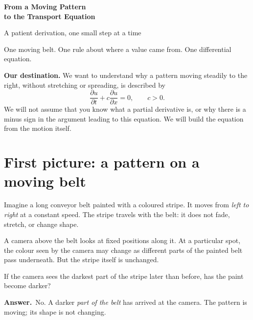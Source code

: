 \documentclass[11pt,a4paper]{article}
\newcommand{\ut}{\frac{\partial u}{\partial t}}
\newcommand{\ux}{\frac{\partial u}{\partial x}}
\newcommand{\secstart}[1]{\Needspace{7\baselineskip}\section{#1}}
\newcommand{\answer}{\par\smallskip\textbf{Answer.}~}
\begin{document}
\thispagestyle{fancy}
\vspace*{6mm}
{\centering
{\Huge\bfseries\color{navy} From a Moving Pattern\\[3pt]to the Transport Equation\par}
\vspace{7mm}
{\large\color{muted} A patient derivation, one small step at a time\par}
\vspace{11mm}
{\small\sffamily One moving belt. One rule about where a value came from. One differential equation.\par}
}
\vspace{9mm}
\begin{pointbox}
\textbf{Our destination.} We want to understand why a pattern moving steadily to the right, without stretching or spreading, is described by
\[
\boxed{\displaystyle \ut+c\ux=0,\qquad c>0.}
\]
We will not assume that you know what a partial derivative is, or why there is a minus sign in the argument leading to this equation. We will build the equation from the motion itself.
\end{pointbox}
\vspace{4mm}
\secstart{First picture: a pattern on a moving belt}
Imagine a long conveyor belt painted with a coloured stripe. It moves from \emph{left to right} at a constant speed. The stripe travels with the belt: it does not fade, stretch, or change shape.

A camera above the belt looks at fixed positions along it. At a particular spot, the colour seen by the camera may change as different parts of the painted belt pass underneath. But the stripe itself is unchanged.

\begin{center}
\end{center}
\begin{thinkbox}
If the camera sees the darkest part of the stripe later than before, has the paint become darker?
\answer No. A darker \emph{part of the belt} has arrived at the camera. The pattern is moving; its shape is not changing.
\end{thinkbox}
\end{document}
